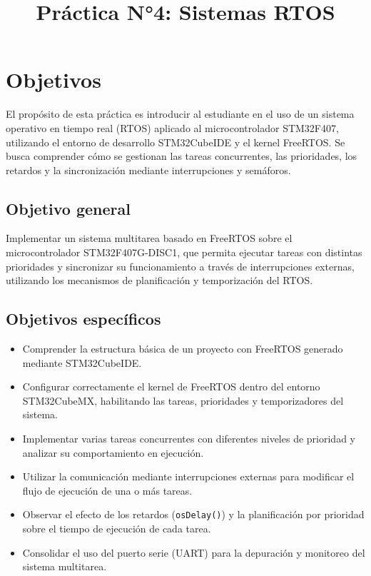 \documentclass[a4paper,12pt]{article}
\title{Práctica N°4: Sistemas RTOS}
\date{}
\begin{document}
\maketitle
\tableofcontents
\newpage


\section{Objetivos}

El propósito de esta práctica es introducir al estudiante en el uso de un sistema operativo en tiempo real (RTOS) aplicado al microcontrolador STM32F407, utilizando el entorno de desarrollo STM32CubeIDE y el kernel FreeRTOS. Se busca comprender cómo se gestionan las tareas concurrentes, las prioridades, los retardos y la sincronización mediante interrupciones y semáforos.

\subsection{Objetivo general}

Implementar un sistema multitarea basado en FreeRTOS sobre el microcontrolador STM32F407G-DISC1, que permita ejecutar tareas con distintas prioridades y sincronizar su funcionamiento a través de interrupciones externas, utilizando los mecanismos de planificación y temporización del RTOS.

\subsection{Objetivos específicos}

\begin{itemize}
    \item Comprender la estructura básica de un proyecto con FreeRTOS generado mediante STM32CubeIDE.
    \item Configurar correctamente el kernel de FreeRTOS dentro del entorno STM32CubeMX, habilitando las tareas, prioridades y temporizadores del sistema.
    \item Implementar varias tareas concurrentes con diferentes niveles de prioridad y analizar su comportamiento en ejecución.
    \item Utilizar la comunicación mediante interrupciones externas para modificar el flujo de ejecución de una o más tareas.
    \item Observar el efecto de los retardos (\texttt{osDelay()}) y la planificación por prioridad sobre el tiempo de ejecución de cada tarea.
    \item Consolidar el uso del puerto serie (UART) para la depuración y monitoreo del sistema multitarea.
\end{itemize}
\end{document}
